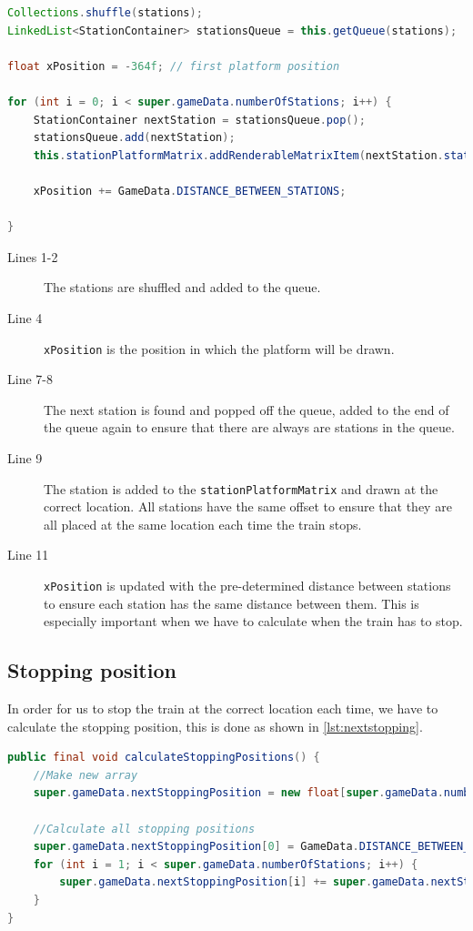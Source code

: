 \begin{lstlisting}[language=java,firstnumber=1,caption={Placing the station correctly.},label=lst:stations]
Collections.shuffle(stations);
LinkedList<StationContainer> stationsQueue = this.getQueue(stations);

float xPosition = -364f; // first platform position

for (int i = 0; i < super.gameData.numberOfStations; i++) {
    StationContainer nextStation = stationsQueue.pop();
    stationsQueue.add(nextStation);
    this.stationPlatformMatrix.addRenderableMatrixItem(nextStation.station, new Coordinate(xPosition + nextStation.xOffset, nextStation.yOffset, 0f));
    
    xPosition += GameData.DISTANCE_BETWEEN_STATIONS;        
    
}
\end{lstlisting}

\begin{description}
\item[Lines 1-2]  The stations are shuffled and added to the queue.
\item[Line 4] \lstinline|xPosition| is the position in which the platform will be drawn. 
\item[Line 7-8] The next station is found and popped off the queue, added to the end of the queue again to ensure that there are  always are stations in the queue. 
\item[Line 9] The station is added to the \lstinline|stationPlatformMatrix| and drawn at the correct location. All stations have the same offset to ensure that they are all placed at the same location each time the train stops. 
\item[Line 11] \lstinline|xPosition| is updated with the pre-determined distance between stations to ensure each station has the same distance between them. This is especially important when we have to calculate when the train has to stop. 
\end{description}

\subsection{Stopping position}

In order for us to stop the train at the correct location each time, we have to calculate the stopping position, this is done as shown in \autoref{lst:nextstopping}.

\begin{lstlisting}[language=java,firstnumber=1,caption={Calculating the next stopping position.},label=lst:nextstopping]
public final void calculateStoppingPositions() {        
    //Make new array
    super.gameData.nextStoppingPosition = new float[super.gameData.numberOfStations + 1];
    
    //Calculate all stopping positions
    super.gameData.nextStoppingPosition[0] = GameData.DISTANCE_BETWEEN_STATIONS;
    for (int i = 1; i < super.gameData.numberOfStations; i++) {
        super.gameData.nextStoppingPosition[i] += super.gameData.nextStoppingPosition[i-1] + GameData.DISTANCE_BETWEEN_STATIONS;
    }
}
\end{lstlisting}


